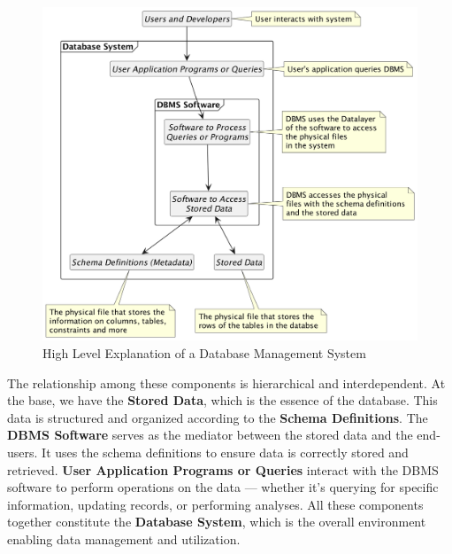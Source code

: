 \begin{figure}[htbp]
    \centering
    \includegraphics[width=1\textwidth]{content/1-relational-databases/figures/1.dbms-definitions.png}
    \caption{High Level Explanation of a Database Management System}
    \label{fig:1.dbms-definitions.png}
\end{figure}

The relationship among these components is hierarchical and interdependent. At the base, we have the \textbf{Stored Data}, which is the essence of the database. This data is structured and organized according to the \textbf{Schema Definitions}. The \textbf{DBMS Software} serves as the mediator between the stored data and the end-users. It uses the schema definitions to ensure data is correctly stored and retrieved. \textbf{User Application Programs or Queries} interact with the DBMS software to perform operations on the data — whether it's querying for specific information, updating records, or performing analyses. All these components together constitute the \textbf{Database System}, which is the overall environment enabling data management and utilization.



